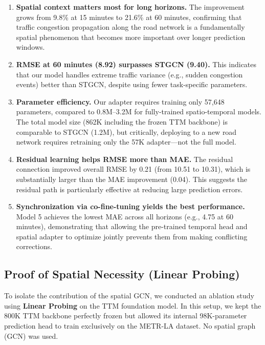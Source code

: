 \documentclass[11pt, a4paper]{article}
\begin{document}
\begin{enumerate}
    \item \textbf{Spatial context matters most for long horizons.} The improvement grows from 9.8\% at 15 minutes to 21.6\% at 60 minutes, confirming that traffic congestion propagation along the road network is a fundamentally spatial phenomenon that becomes more important over longer prediction windows.
    
    \item \textbf{RMSE at 60 minutes (8.92) surpasses STGCN (9.40).} This indicates that our model handles extreme traffic variance (e.g., sudden congestion events) better than STGCN, despite using fewer task-specific parameters.
    
    \item \textbf{Parameter efficiency.} Our adapter requires training only 57,648 parameters, compared to 0.8M--3.2M for fully-trained spatio-temporal models. The total model size (862K including the frozen TTM backbone) is comparable to STGCN (1.2M), but critically, deploying to a new road network requires retraining only the 57K adapter---not the full model.
    
    \item \textbf{Residual learning helps RMSE more than MAE.} The residual connection improved overall RMSE by 0.21 (from 10.51 to 10.31), which is substantially larger than the MAE improvement (0.04). This suggests the residual path is particularly effective at reducing large prediction errors.
    
    \item \textbf{Synchronization via co-fine-tuning yields the best performance.} Model 5 achieves the lowest MAE across all horizons (e.g., 4.75 at 60 minutes), demonstrating that allowing the pre-trained temporal head and spatial adapter to optimize jointly prevents them from making conflicting corrections.
\end{enumerate}

\subsection{Proof of Spatial Necessity (Linear Probing)}

To isolate the contribution of the spatial GCN, we conducted an ablation study using \textbf{Linear Probing} on the TTM foundation model. In this setup, we kept the 800K TTM backbone perfectly frozen but allowed its internal 98K-parameter prediction head to train exclusively on the METR-LA dataset. No spatial graph (GCN) was used.
\end{document}
